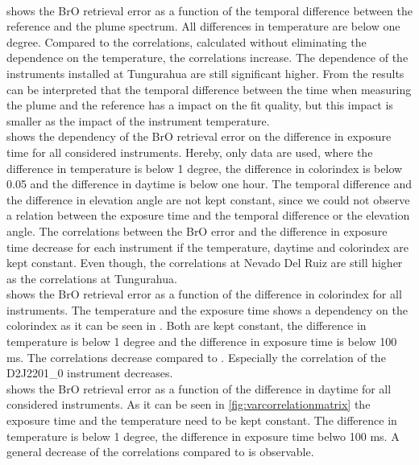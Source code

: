 \documentclass  [
  paper    = a4,
  BCOR     = 10mm,
  twoside,
  fontsize = 12pt,
  fleqn,
  toc      = bibnumbered,
  toc      = listofnumbered,
  numbers  = noendperiod,
  headings = normal,
  listof   = leveldown,
  version  = 3.03
]                                       {scrreprt}
\begin{document}
	\\
	 shows the BrO retrieval error as a function of the temporal difference between the reference and the plume spectrum. All differences in temperature are below one degree. Compared to the correlations, calculated without eliminating the dependence on the temperature, the correlations increase. The dependence of the instruments installed at Tungurahua are still significant higher. From the results can be interpreted that the temporal difference between the time when measuring the plume and the reference has a impact on the fit quality, but this impact is smaller as the impact of the instrument temperature.\\
	 shows the dependency of the BrO retrieval error on the difference in exposure time for all considered instruments. Hereby, only data are used, where the difference in temperature is below 1 degree, the difference in colorindex is below 0.05 and the difference in daytime is below one hour. The temporal difference and the difference in elevation angle are not kept constant, since we could not observe a relation between the exposure time and the temporal difference or the elevation angle. The correlations between the BrO error and the difference in exposure time decrease for each instrument if the temperature, daytime and colorindex are kept constant. Even though, the correlations at Nevado Del Ruiz are still higher as the correlations at Tungurahua.\\
	 shows the BrO retrieval error as a function of the difference in colorindex for all instruments. The temperature and the exposure time shows a dependency on the colorindex as it can be seen in . Both are kept constant, the difference in temperature is below 1 degree and the difference in exposure time is below 100 ms. The correlations decrease compared to . Especially the correlation of the D2J2201\_0 instrument decreases.\\
	 shows the BrO retrieval error as a function of the difference in daytime for all considered instruments. As it can be seen in \cref{fig:varcorrelationmatrix} the exposure time and the temperature need to be kept constant. The difference in temperature is below 1 degree, the difference in exposure time belwo 100 ms. A general decrease of the correlations compared to  is observable.\\
\end{document}
